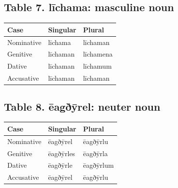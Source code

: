 \subsection*{Table 7. līchama: masculine noun}

\par\begingroup
\fontsize{10.5}{13.2}\selectfont
\setlength{\LTleft}{0pt}\setlength{\LTright}{\fill}
\noindent
\begin{tabular}{@{}>{\raggedright\arraybackslash}p{39.46mm}>{\raggedright\arraybackslash}p{39.46mm}>{\raggedright\arraybackslash}p{39.46mm}@{}}
\toprule
\textbf{Case} & \textbf{Singular} & \textbf{Plural} \\
\midrule
Nominative & līchama & līchaman \\
Genitive & līchaman & līchamena \\
Dative & līchaman & līchamum \\
Accusative & līchaman & līchaman \\
\bottomrule
\end{tabular}
\par\endgroup

\subsection*{Table 8. ēagðȳrel: neuter noun}

\par\begingroup
\fontsize{10.5}{13.2}\selectfont
\setlength{\LTleft}{0pt}\setlength{\LTright}{\fill}
\noindent
\begin{tabular}{@{}>{\raggedright\arraybackslash}p{39.46mm}>{\raggedright\arraybackslash}p{39.46mm}>{\raggedright\arraybackslash}p{39.46mm}@{}}
\toprule
\textbf{Case} & \textbf{Singular} & \textbf{Plural} \\
\midrule
Nominative & ēagðȳrel & ēagðȳrlu \\
Genitive & ēagðȳrles & ēagðȳrla \\
Dative & ēagðȳrle & ēagðȳrlum \\
Accusative & ēagðȳrel & ēagðȳrlu \\
\bottomrule
\end{tabular}
\par\endgroup

